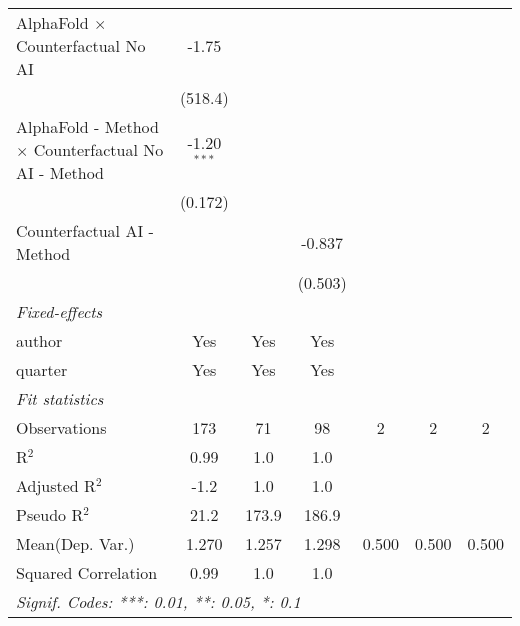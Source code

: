 \begin{tabular}{lcccccc}
   AlphaFold $\times$ Counterfactual No AI                    & -1.75         &               &                &     &     &   \\   
                                                              & (518.4)       &               &                &     &     &   \\   
   AlphaFold - Method $\times$ Counterfactual No AI - Method  & -1.20$^{***}$ &               &                &     &     &   \\   
                                                              & (0.172)       &               &                &     &     &   \\   
   Counterfactual AI - Method                                 &               &               & -0.837         &     &     &   \\   
                                                              &               &               & (0.503)        &     &     &   \\   
   \midrule
   \emph{Fixed-effects}\\
   author                                                     & Yes           & Yes           & Yes            &     &     & \\  
   quarter                                                    & Yes           & Yes           & Yes            &     &     & \\  
   \midrule
   \emph{Fit statistics}\\
   Observations                                               & 173           & 71            & 98             & 2   & 2   & 2\\  
   R$^2$                                                      & 0.99          & 1.0           & 1.0            &     &     & \\  
   Adjusted R$^2$                                             & -1.2          & 1.0           & 1.0            &     &     & \\  
   Pseudo R$^2$                                               & 21.2          & 173.9         & 186.9          &     &     & \\  
Mean(Dep. Var.) & 1.270 & 1.257 & 1.298 & 0.500 & 0.500 & 0.500 \\
   Squared Correlation                                        & 0.99          & 1.0           & 1.0            &     &     & \\  
   \midrule \midrule
   \multicolumn{7}{l}{\emph{Signif. Codes: ***: 0.01, **: 0.05, *: 0.1}}\\
\end{tabular}
\par\endgroup
